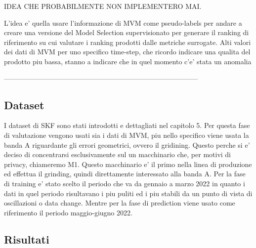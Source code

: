 IDEA CHE PROBABILMENTE NON IMPLEMENTERO MAI.

L'idea e' quella usare l'informazione di MVM come pseudo-labels per andare a creare una versione del Model Selection supervisionato per generare il ranking di riferimento su cui valutare i ranking prodotti dalle metriche surrogate. Alti valori dei dati di MVM per uno specifico time-step, che ricordo indicare una qualita del prodotto piu bassa, stanno a indicare che in quel momento c'e' stata un anomalia

------------------------------------------------------------------------------------

\subsection{Dataset}
I dataset di SKF sono stati introdotti e dettagliati nel capitolo 5. Per questa fase di valutazione vengono usati sia i dati di MVM, piu nello specifico viene usata la banda A riguardante gli errori geometrici, ovvero il gridining. Questo perche si e' deciso di concentrarsi esclusivamente sul un macchinario che, per motivi di privacy, chiameremo M1. Questo macchinario e' il primo nella linea di produzione ed effettua il grinding, quindi direttamente interessato alla banda A.
Per la fase di training e' stato scelto il periodo che va da gennaio a marzo 2022 in quanto i dati in quel periodo risultavano i piu puliti ed i piu stabili da un punto di vista di oscillazioni o data change. Mentre per la fase di prediction viene usato come riferimento il periodo maggio-giugno 2022.
\subsection{Risultati}


